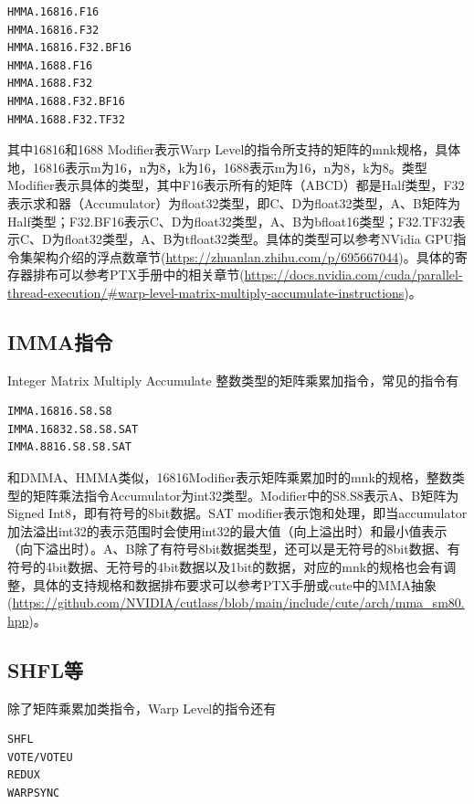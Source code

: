 \begin{lstlisting}
HMMA.16816.F16
HMMA.16816.F32
HMMA.16816.F32.BF16
HMMA.1688.F16
HMMA.1688.F32
HMMA.1688.F32.BF16
HMMA.1688.F32.TF32
\end{lstlisting}

其中16816和1688 Modifier表示Warp Level的指令所支持的矩阵的mnk规格，具体地，16816表示m为16，n为8，k为16，1688表示m为16，n为8，k为8。类型Modifier表示具体的类型，其中F16表示所有的矩阵（ABCD）都是Half类型，F32表示求和器（Accumulator）为float32类型，即C、D为float32类型，A、B矩阵为Half类型；F32.BF16表示C、D为float32类型，A、B为bfloat16类型；F32.TF32表示C、D为float32类型，A、B为tfloat32类型。具体的类型可以参考NVidia GPU指令集架构介绍的浮点数章节(\url{https://zhuanlan.zhihu.com/p/695667044})。具体的寄存器排布可以参考PTX手册中的相关章节(\url{https://docs.nvidia.com/cuda/parallel-thread-execution/#warp-level-matrix-multiply-accumulate-instructions})。

\subsection{IMMA指令}

Integer Matrix Multiply Accumulate 整数类型的矩阵乘累加指令，常见的指令有

\begin{lstlisting}
IMMA.16816.S8.S8
IMMA.16832.S8.S8.SAT
IMMA.8816.S8.S8.SAT
\end{lstlisting}

和DMMA、HMMA类似，16816Modifier表示矩阵乘累加时的mnk的规格，整数类型的矩阵乘法指令Accumulator为int32类型。Modifier中的S8.S8表示A、B矩阵为Signed Int8，即有符号的8bit数据。SAT modifier表示饱和处理，即当accumulator加法溢出int32的表示范围时会使用int32的最大值（向上溢出时）和最小值表示（向下溢出时）。A、B除了有符号8bit数据类型，还可以是无符号的8bit数据、有符号的4bit数据、无符号的4bit数据以及1bit的数据，对应的mnk的规格也会有调整，具体的支持规格和数据排布要求可以参考PTX手册或cute中的MMA抽象(\url{https://github.com/NVIDIA/cutlass/blob/main/include/cute/arch/mma_sm80.hpp})。

\subsection{SHFL等}

除了矩阵乘累加类指令，Warp Level的指令还有

\begin{lstlisting}
SHFL
VOTE/VOTEU
REDUX
WARPSYNC
\end{lstlisting}

